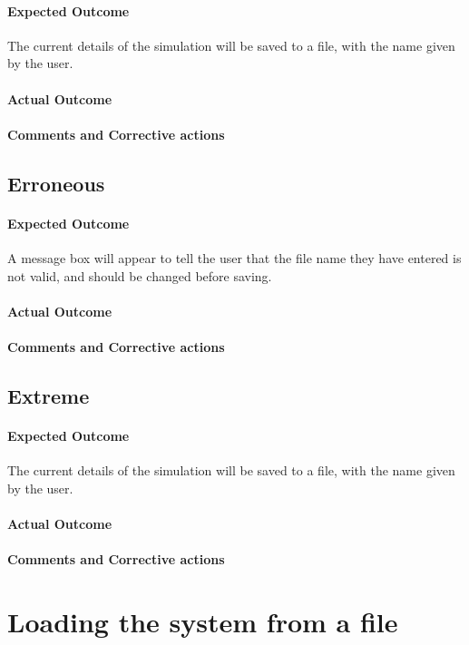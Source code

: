 \paragraph{Expected Outcome}
The current details of the simulation will be saved to a file, with the name
given by the user.
\paragraph{Actual Outcome}
\paragraph{Comments and Corrective actions}

\subsection{Erroneous}
\paragraph{Expected Outcome}
A message box will appear to tell the user that the file name they have entered
is not valid, and should be changed before saving.
\paragraph{Actual Outcome}
\paragraph{Comments and Corrective actions}

\subsection{Extreme}
\paragraph{Expected Outcome}
The current details of the simulation will be saved to a file, with the name
given by the user.
\paragraph{Actual Outcome}
\paragraph{Comments and Corrective actions}


\section{Loading the system from a file}
